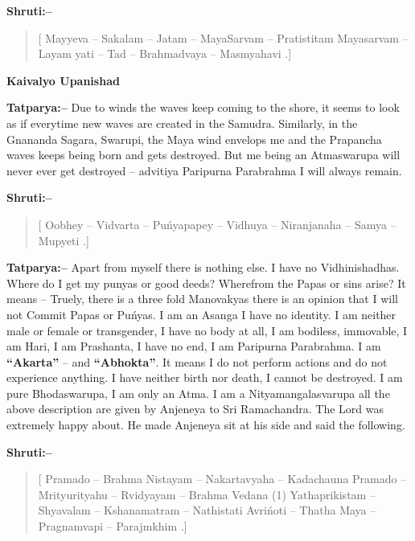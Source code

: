 \textbf{Shruti:–}

\begin{verse}
[ Mayyeva – Sakalam – Jatam – MayaSarvam – Pratistitam  Mayasarvam – Layam yati – Tad – Brahmadvaya – Masmyahavi .]
\end{verse}

\begin{flushright}
\textbf{Kaivalyo Upanishad}
\end{flushright}

\textbf{Tatparya:–} Due to winds the waves keep coming to the shore, it seems to look as if everytime new waves are created in the Samudra. Similarly, in the Gnananda Sagara, Swarupi, the Maya wind envelops me and the Prapancha waves keeps being born and gets destroyed. But me being an Atmaswarupa will never ever get destroyed – advitiya Paripurna Parabrahma I will always remain.

\textbf{Shruti:–}

\begin{verse}
[ Oobhey – Vidvarta – Puńyapapey – Vidhuya – Niranjanaha – Samya – Mupyeti .]
\end{verse}

\textbf{Tatparya:–} Apart from myself there is nothing else. I have no Vidhinishadhas. Where do I get my punyas or good deeds? Wherefrom the Papas or sins arise? It means – Truely, there is a three fold Manovakyas there is an opinion that I will not Commit Papas or Puńyas. I am an Asanga I have no identity. I am neither male or female or transgender, I have no body at all, I am bodiless, immovable, I am Hari, I am Prashanta, I have no end, I am Paripurna Parabrahma. I am \textbf{“Akarta”} – and \textbf{“Abhokta”}. It means I do not perform actions and do not experience anything. I have neither birth nor death, I cannot be destroyed. I am pure Bhodaswarupa, I am only an Atma. I am a Nityamangalasvarupa all the above description are given by Anjeneya to Sri Ramachandra. The Lord was extremely happy about. He made Anjeneya sit at his side and said the following.

\textbf{Shruti:–}

\begin{verse}
[ Pramado – Brahma Nistayam – Nakartavyaha – Kadachauna  Pramado – Mrityurityahu – Rvidyayam – Brahma Vedana (1) Yathaprikistam – Shyavalam – Kshanamatram – Nathistati  Avrińoti – Thatha Maya – Pragnamvapi – Parajmkhim .]
\end{verse}

